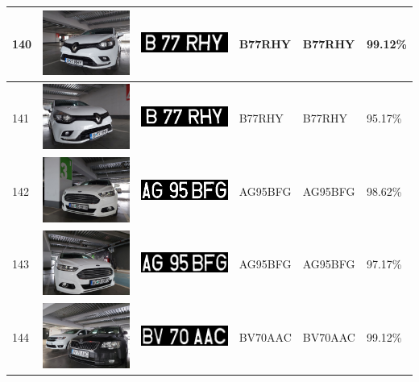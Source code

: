 \documentclass[a4paper,12pt]{report}
\begin{document}
\begin{longtable}{| m{0.6cm} | m{3cm} | m{3cm} | m{1.8cm} | m{1.8cm} | m{1.8cm} |}
        140 & \includegraphics[width=3cm,keepaspectratio]{dataset/82_d2.jpg} & \includegraphics[width=3cm,keepaspectratio]{segmentari/140.jpg} & B77RHY & B77RHY & 99.12\% \\ \hline
        141 & \includegraphics[width=3cm,keepaspectratio]{dataset/82_s1.jpg} & \includegraphics[width=3cm,keepaspectratio]{segmentari/141.jpg} & B77RHY & B77RHY & 95.17\% \\ \hline
        142 & \includegraphics[width=3cm,keepaspectratio]{dataset/83_d1.jpg} & \includegraphics[width=3cm,keepaspectratio]{segmentari/142.jpg} & AG95BFG & AG95BFG & 98.62\% \\ \hline
        143 & \includegraphics[width=3cm,keepaspectratio]{dataset/83_s1.jpg} & \includegraphics[width=3cm,keepaspectratio]{segmentari/143.jpg} & AG95BFG & AG95BFG & 97.17\% \\ \hline
        144 & \includegraphics[width=3cm,keepaspectratio]{dataset/84_d1.jpg} & \includegraphics[width=3cm,keepaspectratio]{segmentari/144.jpg} & BV70AAC & BV70AAC & 99.12\% \\ \hline

\end{longtable}
\end{document}
